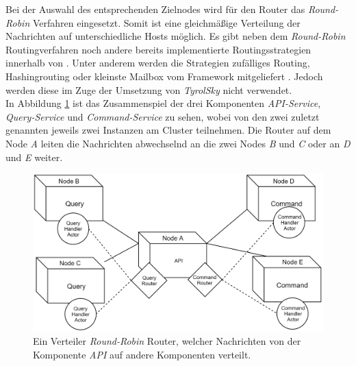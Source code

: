 % 
Bei der Auswahl des entsprechenden Zielnodes wird  für den Router das \textit{Round-Robin} Verfahren eingesetzt. Somit ist eine gleichmäßige Verteilung der Nachrichten auf  unterschiedliche Hosts möglich. Es gibt neben dem \textit{Round-Robin} Routingverfahren noch andere bereits implementierte Routingsstrategien innerhalb von . Unter anderem werden die Strategien zufälliges Routing, Hashingrouting oder kleinste Mailbox vom Framework mitgeliefert \citep{Akka.netCommunityAkka.NETDocumentation}. Jedoch werden diese im Zuge der Umsetzung von \textit{TyrolSky} nicht verwendet. \\
In Abbildung \ref{fig:implementation:routing} ist das Zusammenspiel der drei Komponenten \textit{API-Service}, \textit{Query-Service} und \textit{Command-Service} zu sehen, wobei von den zwei zuletzt genannten jeweils zwei Instanzen am Cluster teilnehmen. Die Router auf dem Node \textit{A} leiten die Nachrichten abwechselnd an die zwei Nodes \textit{B} und \textit{C} oder an \textit{D} und \textit{E} weiter. 

\begin{figure}
    \centering
    \includegraphics[width=\linewidth]{gfx/implementation/ClusterRouter}
    \caption{Ein Verteiler \textit{Round-Robin} Router, welcher Nachrichten von der Komponente \textit{API} auf andere Komponenten verteilt.}
    \label{fig:implementation:routing}
\end{figure} 

